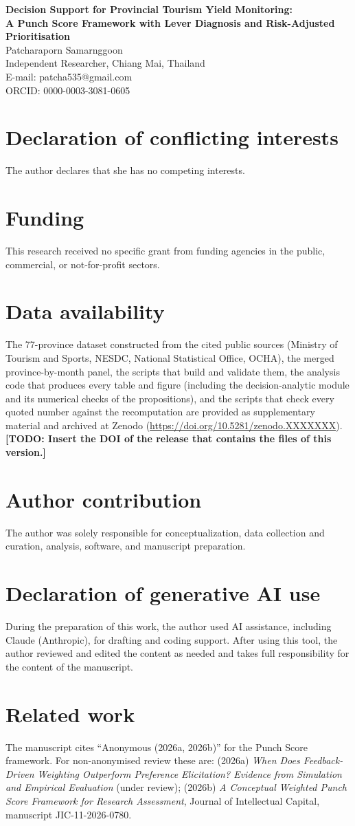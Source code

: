 \documentclass[11pt,a4paper]{article}
\newif\ifdraft \drafttrue
\newcommand{\todo}[1]{\ifdraft{\color{red}\textbf{[TODO: #1]}}\fi}
\newcommand{\RepoDOI}{10.5281/zenodo.XXXXXXX}   %
\begin{document}
\begin{center}
{\LARGE\bfseries Decision Support for Provincial Tourism Yield Monitoring:\\ A Punch Score Framework with Lever Diagnosis and Risk-Adjusted Prioritisation}\\[1.5em]
{\large Patcharaporn Samarnggoon}\\
Independent Researcher, Chiang Mai, Thailand\\
E-mail: patcha535@gmail.com\\
ORCID: 0000-0003-3081-0605
\end{center}
\bigskip
\section*{Declaration of conflicting interests}
The author declares that she has no competing interests.
\section*{Funding}
This research received no specific grant from funding agencies in the public, commercial, or not-for-profit sectors.
\section*{Data availability}
The 77-province dataset constructed from the cited public sources (Ministry of Tourism and Sports, NESDC, National Statistical Office, OCHA), the merged province-by-month panel, the scripts that build and validate them, the analysis code that produces every table and figure (including the decision-analytic module and its numerical checks of the propositions), and the scripts that check every quoted number against the recomputation are provided as supplementary material and archived at Zenodo (\url{https://doi.org/\RepoDOI}). \todo{Insert the DOI of the release that contains the files of this version.}
\section*{Author contribution}
The author was solely responsible for conceptualization, data collection and curation, analysis, software, and manuscript preparation.
\section*{Declaration of generative AI use}
During the preparation of this work, the author used AI assistance, including Claude (Anthropic), for drafting and coding support. After using this tool, the author reviewed and edited the content as needed and takes full responsibility for the content of the manuscript.
\section*{Related work}
The manuscript cites ``Anonymous (2026a, 2026b)'' for the Punch Score framework. For non-anonymised review these are: (2026a) \emph{When Does Feedback-Driven Weighting Outperform Preference Elicitation? Evidence from Simulation and Empirical Evaluation} (under review); (2026b) \emph{A Conceptual Weighted Punch Score Framework for Research Assessment}, Journal of Intellectual Capital, manuscript JIC-11-2026-0780.
\end{document}
